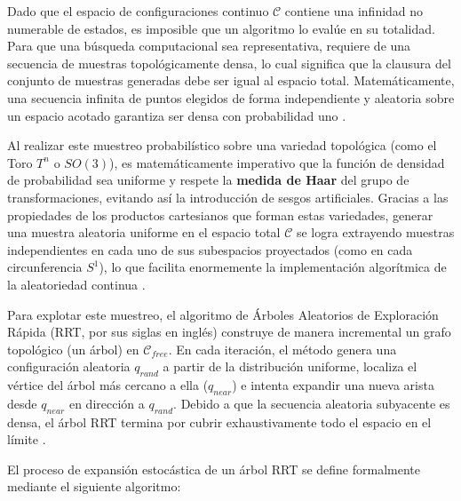 Dado que el espacio de configuraciones continuo $\mathcal{C}$ contiene una infinidad 
no numerable de estados, es imposible que un algoritmo lo evalúe en su totalidad. 
Para que una búsqueda computacional sea representativa, requiere de una secuencia de muestras 
topológicamente densa, lo cual significa que la clausura del conjunto de muestras generadas debe 
ser igual al espacio total. Matemáticamente, una secuencia infinita de puntos elegidos de 
forma independiente y aleatoria sobre un espacio acotado garantiza ser densa con probabilidad uno \parencite{lavalle2006planning}.

Al realizar este muestreo probabilístico sobre una variedad topológica 
(como el Toro $T^n$ o $SO(3)$), es matemáticamente imperativo que la función de densidad 
de probabilidad sea uniforme y respete la \textbf{medida de Haar} del grupo de transformaciones, 
evitando así la introducción de sesgos artificiales. Gracias a las 
propiedades de los productos cartesianos que forman estas variedades, generar una muestra 
aleatoria uniforme en el espacio total $\mathcal{C}$ se logra extrayendo muestras independientes 
en cada uno de sus subespacios proyectados (como en cada circunferencia $S^1$), lo 
que facilita enormemente la implementación algorítmica de la aleatoriedad continua \parencite{lavalle2006planning}.

Para explotar este muestreo, el algoritmo de Árboles Aleatorios de Exploración Rápida 
(RRT, por sus siglas en inglés) construye de manera incremental un grafo topológico (un árbol) 
en $\mathcal{C}_{free}$. En cada iteración, el método genera una configuración aleatoria 
$q_{rand}$ a partir de la distribución uniforme, localiza el vértice del árbol más cercano 
a ella ($q_{near}$) e intenta expandir una nueva arista desde $q_{near}$ en dirección 
a $q_{rand}$. Debido a que la secuencia aleatoria subyacente es densa, el árbol RRT termina 
por cubrir exhaustivamente todo el espacio en el límite \parencite{Choset2005}.

El proceso de expansión estocástica de un árbol RRT se define formalmente mediante el siguiente algoritmo:

